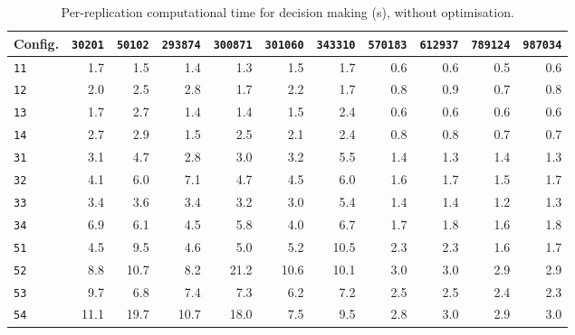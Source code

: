 \begin{table}[htb]
\centering
\small
\caption{Per-replication computational time for decision making (s), without optimisation.}
\label{tab:app_time_opt_false}
\begin{tabular}{@{}lrrrrrrrrrr@{}}
\toprule
\textbf{Config.} & \texttt{30201} & \texttt{50102} & \texttt{293874} & \texttt{300871} & \texttt{301060} & \texttt{343310} & \texttt{570183} & \texttt{612937} & \texttt{789124} & \texttt{987034} \\
\midrule
\texttt{11} & 1.7 & 1.5 & 1.4 & 1.3 & 1.5 & 1.7 & 0.6 & 0.6 & 0.5 & 0.6 \\
\texttt{12} & 2.0 & 2.5 & 2.8 & 1.7 & 2.2 & 1.7 & 0.8 & 0.9 & 0.7 & 0.8 \\
\texttt{13} & 1.7 & 2.7 & 1.4 & 1.4 & 1.5 & 2.4 & 0.6 & 0.6 & 0.6 & 0.6 \\
\texttt{14} & 2.7 & 2.9 & 1.5 & 2.5 & 2.1 & 2.4 & 0.8 & 0.8 & 0.7 & 0.7 \\
\texttt{31} & 3.1 & 4.7 & 2.8 & 3.0 & 3.2 & 5.5 & 1.4 & 1.3 & 1.4 & 1.3 \\
\texttt{32} & 4.1 & 6.0 & 7.1 & 4.7 & 4.5 & 6.0 & 1.6 & 1.7 & 1.5 & 1.7 \\
\texttt{33} & 3.4 & 3.6 & 3.4 & 3.2 & 3.0 & 5.4 & 1.4 & 1.4 & 1.2 & 1.3 \\
\texttt{34} & 6.9 & 6.1 & 4.5 & 5.8 & 4.0 & 6.7 & 1.7 & 1.8 & 1.6 & 1.8 \\
\texttt{51} & 4.5 & 9.5 & 4.6 & 5.0 & 5.2 & 10.5 & 2.3 & 2.3 & 1.6 & 1.7 \\
\texttt{52} & 8.8 & 10.7 & 8.2 & 21.2 & 10.6 & 10.1 & 3.0 & 3.0 & 2.9 & 2.9 \\
\texttt{53} & 9.7 & 6.8 & 7.4 & 7.3 & 6.2 & 7.2 & 2.5 & 2.5 & 2.4 & 2.3 \\
\texttt{54} & 11.1 & 19.7 & 10.7 & 18.0 & 7.5 & 9.5 & 2.8 & 3.0 & 2.9 & 3.0 \\
\bottomrule
\end{tabular}
\end{table}

